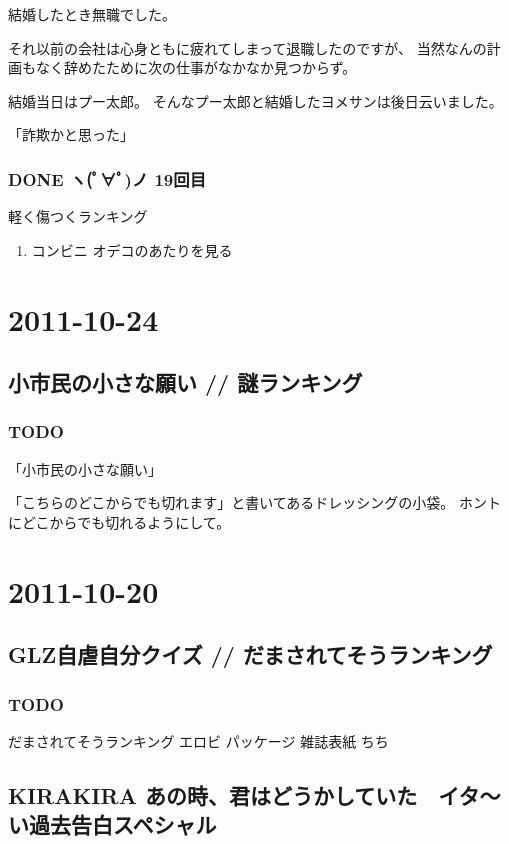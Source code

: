\documentclass[11pt]{article}
\begin{document}
結婚したとき無職でした。

それ以前の会社は心身ともに疲れてしまって退職したのですが、
当然なんの計画もなく辞めたために次の仕事がなかなか見つからず。

結婚当日はプー太郎。
そんなプー太郎と結婚したヨメサンは後日云いました。

「詐欺かと思った」
\subsubsection{\textbf{DONE} ヽ(ﾟ∀ﾟ)ノ 19回目}
\label{sec-51_1_3}

軽く傷つくランキング 

\begin{enumerate}
\item コンビニ オデコのあたりを見る
\end{enumerate}
\section{2011-10-24}
\label{sec-52}
\subsection{小市民の小さな願い // 謎ランキング}
\label{sec-52_1}
\subsubsection{\textbf{TODO}}
\label{sec-52_1_1}

「小市民の小さな願い」

「こちらのどこからでも切れます」と書いてあるドレッシングの小袋。
ホントにどこからでも切れるようにして。
\section{2011-10-20}
\label{sec-53}
\subsection{GLZ自虐自分クイズ // だまされてそうランキング}
\label{sec-53_1}
\subsubsection{\textbf{TODO}}
\label{sec-53_1_1}

だまされてそうランキング
エロビ パッケージ
雑誌表紙
ちち
\subsection{KIRAKIRA あの時、君はどうかしていた　イタ～い過去告白スペシャル}
\label{sec-53_2}
\end{document}

